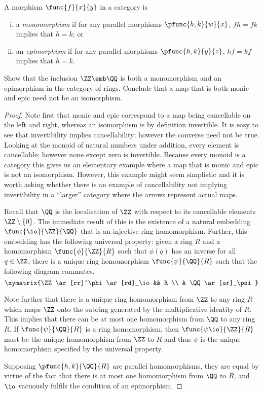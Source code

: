 \documentclass[main.tex]{subfiles}
\begin{document}
\begin{definition}
	A morphism \(\func{f}{x}{y}\) in a category is
	\begin{enumerate}[(i)]
		\item a \emph{monomorphism} if for any parallel morphisms
			\(\pfunc{h,k}{w}{x}\), \(fh=fk\) implies that \(h=k\); or
		\item an \emph{epimorphism} if for any parallel morphisms
			\(\pfunc{h,k}{y}{z}\), \(hf=kf\) implies that \(h=k\).
	\end{enumerate}
\end{definition}
\popthm

\begin{exercise}
	Show that the inclusion \(\ZZ\emb\QQ\) is both a monomorphism and an
	epimorphism in the category \Ring of rings. Conclude that a map that is both
	monic and epic need not be an isomorphism.
\end{exercise}
\begin{proof}
	Note first that monic and epic correspond to a map being cancellable on the
	left and right, whereas an isomorphism is by definition invertible. It is
	easy to see that invertibility implies cancellability; however the converse
	need not be true. Looking at the monoid of natural numbers under addition,
	every element is cancellable; however none except zero is invertible.
	Because every monoid is a category this gives us an elementary example where
	a map that is monic and epic is not an isomorphism. However, this example
	might seem simplistic and it is worth asking whether there is an example of
	cancellability not implying invertibility in a ``larger'' category where the
	arrows represent actual maps.

	Recall that \(\QQ\) is the localisation of \(\ZZ\) with respect to its
	cancellable elements \(\ZZ\setminus\{0\}\). The immediate result of this is
	the existence of a natural embedding \(\func{\io}{\ZZ}{\QQ}\) that is an
	injective ring homomorphism. Further, this embedding has the following
	universal property: given a ring \(R\) and a homomorphism
	\(\func{\phi}{\ZZ}{R}\) such that \(\phi(q)\) has an inverse for all
	\(q\in\ZZ\), there is a unique ring homomorphism \(\func{\psi}{\QQ}{R}\)
	such that the following diagram commutes.
	\[\xymatrix{\ZZ \ar[rr]^\phi \ar[rd]_\io && R \\ & \QQ \ar[ur]_\psi}\]

	Note further that there is a unique ring homomorphism from \(\ZZ\) to any
	ring \(R\) which maps \(\ZZ\) onto the subring generated by the
	multiplicative identity of \(R\). This implies that there can be at most one
	homomorphism from \(\QQ\) to any ring \(R\). If \(\func{\psi}{\QQ}{R}\) is a
	ring homomorphism, then \(\func{\psi\io}{\ZZ}{R}\) must be the unique
	homomorphism from \(\ZZ\) to \(R\) and thus \(\psi\) is the unique
	homomorphism specified by the universal property.

	Supposing \(\pfunc{h,k}{\QQ}{R}\) are parallel homomorphisms, they are equal
	by virtue of the fact that there is at most one homomorphism from \(\QQ\) to
	\(R\), and \(\io\) vacuously fulfils the condition of an epimorphism.
\end{proof}
\end{document}
